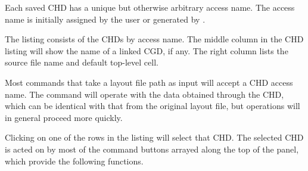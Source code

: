 Each saved CHD has a unique but otherwise arbitrary access name.  The
access name is initially assigned by the user or generated by {\Xic}. 

The listing consists of the CHDs by access name.  The middle column in
the CHD listing will show the name of a linked CGD, if any.  The right
column lists the source file name and default top-level cell.

Most {\Xic} commands that take a layout file path as input will
accept a CHD access name.  The command will operate with the data
obtained through the CHD, which can be identical with
that from the original layout file, but operations will in general
proceed more quickly.

Clicking on one of the rows in the listing will select that CHD.  The
selected CHD is acted on by most of the command buttons arrayed along
the top of the panel, which provide the following functions.

